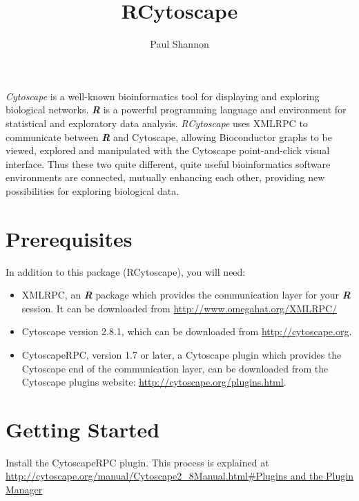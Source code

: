 \documentclass[12pt]{article}
\title{RCytoscape}
\author{Paul Shannon}
\begin{document}
\maketitle

\emph{Cytoscape} is a well-known bioinformatics tool for displaying and exploring biological networks.
\emph{\textbf{R}} is a powerful programming language and environment for statistical and exploratory data analysis.
\emph{RCytoscape} uses XMLRPC to communicate between \emph{\textbf{R}} and Cytoscape, allowing Bioconductor graphs to be
viewed, explored and manipulated with the Cytoscape point-and-click visual interface.  Thus these two quite different,
quite useful bioinformatics software environments are connected, mutually enhancing each other, providing new
possibilities for exploring biological data.

\section{Prerequisites}
In addition to this package (RCytoscape), you will need:

\begin{itemize}
  \item XMLRPC, an \emph{\textbf{R}} package which provides the communication layer for your \emph{\textbf{R}} session.  It can be downloaded from 
      \url{http://www.omegahat.org/XMLRPC/}
  \item Cytoscape version 2.8.1, which can be downloaded from 
     \url{http://cytoscape.org}.
  \item CytoscapeRPC, version 1.7 or later, a Cytoscape plugin which provides the Cytoscape end of the communication layer, can be downloaded from the Cytoscape plugins website:
     \url{http://cytoscape.org/plugins.html}.
\end{itemize}

\section{Getting Started}

Install the CytoscapeRPC plugin.  This process is explained at\\

 \url{http://cytoscape.org/manual/Cytoscape2_8Manual.html#Plugins and the Plugin Manager}\newline\newline
\end{document}
